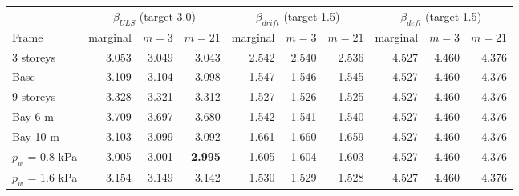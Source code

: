 \begin{tabular}{lrrrrrrrrr}
\toprule
 & \multicolumn{3}{c}{$\beta_{ULS}$ (target 3.0)} & \multicolumn{3}{c}{$\beta_{drift}$ (target 1.5)} & \multicolumn{3}{c}{$\beta_{defl}$ (target 1.5)} \\
\cmidrule(lr){2-4}\cmidrule(lr){5-7}\cmidrule(lr){8-10}
Frame & marginal & $m=3$ & $m=21$ & marginal & $m=3$ & $m=21$ & marginal & $m=3$ & $m=21$ \\
\midrule
3 storeys & 3.053 & 3.049 & 3.043 & 2.542 & 2.540 & 2.536 & 4.527 & 4.460 & 4.376 \\
Base & 3.109 & 3.104 & 3.098 & 1.547 & 1.546 & 1.545 & 4.527 & 4.460 & 4.376 \\
9 storeys & 3.328 & 3.321 & 3.312 & 1.527 & 1.526 & 1.525 & 4.527 & 4.460 & 4.376 \\
Bay 6 m & 3.709 & 3.697 & 3.680 & 1.542 & 1.541 & 1.540 & 4.527 & 4.460 & 4.376 \\
Bay 10 m & 3.103 & 3.099 & 3.092 & 1.661 & 1.660 & 1.659 & 4.527 & 4.460 & 4.376 \\
$p_w$ = 0.8 kPa & 3.005 & 3.001 & \textbf{2.995} & 1.605 & 1.604 & 1.603 & 4.527 & 4.460 & 4.376 \\
$p_w$ = 1.6 kPa & 3.154 & 3.149 & 3.142 & 1.530 & 1.529 & 1.528 & 4.527 & 4.460 & 4.376 \\
\bottomrule
\end{tabular}